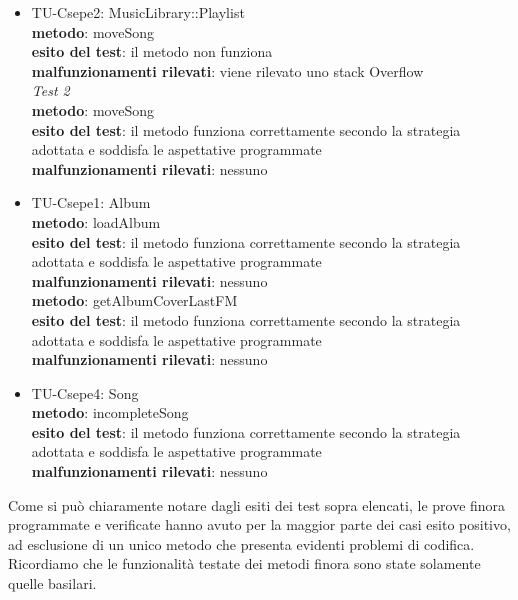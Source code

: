 \begin{itemize}
 
 \item TU-Csepe2: MusicLibrary::Playlist\\
 \textbf{metodo}: moveSong\\
 \textbf{esito del test}: il metodo non funziona\\
 \textbf{malfunzionamenti rilevati}: viene rilevato uno stack Overflow\\
 
 \emph{Test 2}\\
 \textbf{metodo}: moveSong\\
 \textbf{esito del test}: il metodo funziona correttamente secondo la strategia
  adottata e soddisfa le aspettative programmate\\
 \textbf{malfunzionamenti rilevati}: nessuno\\
 
 \item TU-Csepe1: Album\\
 \textbf{metodo}: loadAlbum\\
 \textbf{esito del test}: il metodo funziona correttamente secondo la strategia
  adottata e soddisfa le aspettative programmate\\
 \textbf{malfunzionamenti rilevati}: nessuno\\
 
 \textbf{metodo}: getAlbumCoverLastFM\\
 \textbf{esito del test}: il metodo funziona correttamente secondo la strategia
  adottata e soddisfa le aspettative programmate\\
 \textbf{malfunzionamenti rilevati}: nessuno\\
 
 \item TU-Csepe4: Song\\
 \textbf{metodo}: incompleteSong\\
 \textbf{esito del test}: il metodo funziona correttamente secondo la strategia
  adottata e soddisfa le aspettative programmate\\
 \textbf{malfunzionamenti rilevati}: nessuno\\
 
  
  
\end{itemize}  

Come si pu\`o chiaramente notare dagli esiti dei test sopra elencati, le prove
finora programmate e verificate hanno avuto per la maggior parte dei
casi esito positivo, ad esclusione di un unico metodo che presenta evidenti
problemi di codifica. Ricordiamo che le funzionalit\`a testate dei metodi finora 
sono state solamente quelle basilari.
  
